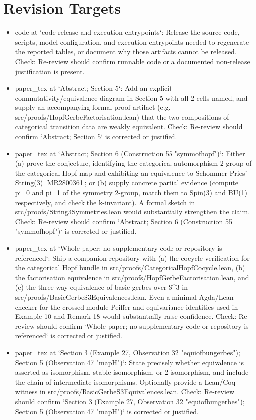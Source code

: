 \documentclass[11pt]{article}
\begin{document}
\section*{Revision Targets}
\begin{itemize}[leftmargin=*]
  \item [open] code at `code release and execution entrypoints`: Release the source code, scripts, model configuration, and execution entrypoints needed to regenerate the reported tables, or document why those artifacts cannot be released. Check: Re-review should confirm runnable code or a documented non-release justification is present.
  \item [open] paper\_tex at `Abstract; Section 5`: Add an explicit commutativity/equivalence diagram in Section 5 with all 2-cells named, and supply an accompanying formal proof artifact (e.g. src/proofs/HopfGerbeFactorisation.lean) that the two compositions of categorical transition data are weakly equivalent. Check: Re-review should confirm `Abstract; Section 5` is corrected or justified.
  \item [open] paper\_tex at `Abstract; Section 6 (Construction 55 "symmofhopf")`: Either (a) prove the conjecture, identifying the categorical automorphism 2-group of the categorical Hopf map and exhibiting an equivalence to Schommer-Pries' String(3) [MR2800361]; or (b) supply concrete partial evidence (compute pi\_0 and pi\_1 of the symmetry 2-group, match them to Spin(3) and BU(1) respectively, and check the k-invariant). A formal sketch in src/proofs/String3Symmetries.lean would substantially strengthen the claim. Check: Re-review should confirm `Abstract; Section 6 (Construction 55 "symmofhopf")` is corrected or justified.
  \item [open] paper\_tex at `Whole paper; no supplementary code or repository is referenced`: Ship a companion repository with (a) the cocycle verification for the categorical Hopf bundle in src/proofs/CategoricalHopfCocycle.lean, (b) the factorisation equivalence in src/proofs/HopfGerbeFactorisation.lean, and (c) the three-way equivalence of basic gerbes over S\^{}3 in src/proofs/BasicGerbeS3Equivalences.lean. Even a minimal Agda/Lean checker for the crossed-module Peiffer and equivariance identities used in Example 10 and Remark 18 would substantially raise confidence. Check: Re-review should confirm `Whole paper; no supplementary code or repository is referenced` is corrected or justified.
  \item [open] paper\_tex at `Section 3 (Example 27, Observation 32 "equiofbungerbes"); Section 5 (Observation 47 "mapH")`: State precisely whether equivalence is asserted as isomorphism, stable isomorphism, or 2-isomorphism, and include the chain of intermediate isomorphisms. Optionally provide a Lean/Coq witness in src/proofs/BasicGerbeS3Equivalences.lean. Check: Re-review should confirm `Section 3 (Example 27, Observation 32 "equiofbungerbes"); Section 5 (Observation 47 "mapH")` is corrected or justified.
\end{itemize}
\end{document}
